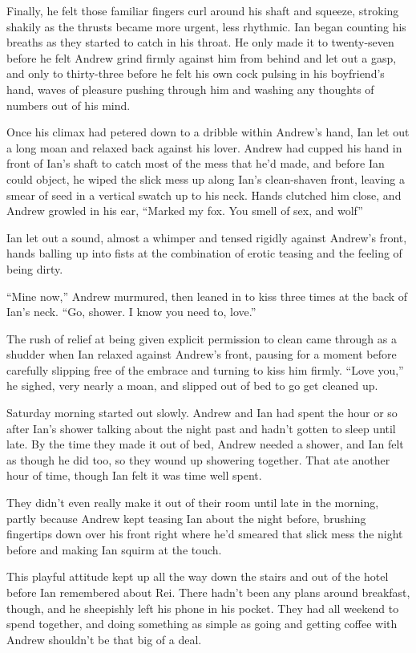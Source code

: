 Finally, he felt those familiar fingers curl around his shaft and squeeze, stroking shakily as the thrusts became more urgent, less rhythmic. Ian began counting his breaths as they started to catch in his throat. He only made it to twenty-seven before he felt Andrew grind firmly against him from behind and let out a gasp, and only to thirty-three before he felt his own cock pulsing in his boyfriend's hand, waves of pleasure pushing through him and washing any thoughts of numbers out of his mind.

Once his climax had petered down to a dribble within Andrew's hand, Ian let out a long moan and relaxed back against his lover. Andrew had cupped his hand in front of Ian's shaft to catch most of the mess that he'd made, and before Ian could object, he wiped the slick mess up along Ian's clean-shaven front, leaving a smear of seed in a vertical swatch up to his neck. Hands clutched him close, and Andrew growled in his ear, ``Marked my fox. You smell of sex, and wolf''

Ian let out a sound, almost a whimper and tensed rigidly against Andrew's front, hands balling up into fists at the combination of erotic teasing and the feeling of being dirty.

``Mine now,'' Andrew murmured, then leaned in to kiss three times at the back of Ian's neck. ``Go, shower. I know you need to, love.''

The rush of relief at being given explicit permission to clean came through as a shudder when Ian relaxed against Andrew's front, pausing for a moment before carefully slipping free of the embrace and turning to kiss him firmly. ``Love you,'' he sighed, very nearly a moan, and slipped out of bed to go get cleaned up.

\secdiv

Saturday morning started out slowly. Andrew and Ian had spent the hour or so after Ian's shower talking about the night past and hadn't gotten to sleep until late. By the time they made it out of bed, Andrew needed a shower, and Ian felt as though he did too, so they wound up showering together. That ate another hour of time, though Ian felt it was time well spent.

They didn't even really make it out of their room until late in the morning, partly because Andrew kept teasing Ian about the night before, brushing fingertips down over his front right where he'd smeared that slick mess the night before and making Ian squirm at the touch.

This playful attitude kept up all the way down the stairs and out of the hotel before Ian remembered about Rei. There hadn't been any plans around breakfast, though, and he sheepishly left his phone in his pocket. They had all weekend to spend together, and doing something as simple as going and getting coffee with Andrew shouldn't be that big of a deal.

